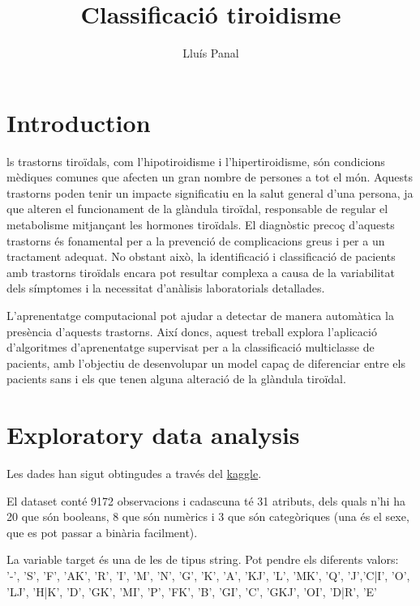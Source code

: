 \documentclass[9pt,a4paper,twoside]{tau-class/tau}
\title{Classificació tiroidisme}
\author[a,1]{Lluís Panal}
\affil[a]{1668072}
\begin{document}
    \maketitle 
    \thispagestyle{firststyle} \tauabstract 
    \tableofcontents
    \linenumbers 
    

\section{Introduction}

    ls trastorns tiroïdals, com l'hipotiroidisme i l'hipertiroidisme, són condicions mèdiques comunes que afecten un gran nombre de persones a tot el món. Aquests trastorns poden tenir un impacte significatiu en la salut general d'una persona, ja que alteren el funcionament de la glàndula tiroïdal, responsable de regular el metabolisme mitjançant les hormones tiroïdals. El diagnòstic precoç d'aquests trastorns és fonamental per a la prevenció de complicacions greus i per a un tractament adequat. No obstant això, la identificació i classificació de pacients amb trastorns tiroïdals encara pot resultar complexa a causa de la variabilitat dels símptomes i la necessitat d'anàlisis laboratorials detallades.

    L'aprenentatge computacional pot ajudar a detectar de manera automàtica la presència d'aquests trastorns. Així doncs, aquest treball explora l'aplicació d'algoritmes d'aprenentatge supervisat per a la classificació multiclasse de pacients, amb l'objectiu de desenvolupar un model capaç de diferenciar entre els pacients sans i els que tenen alguna alteració de la glàndula tiroïdal.

\section{Exploratory data analysis}
    Les dades han sigut obtingudes a través del \href{https://www.kaggle.com/datasets/emmanuelfwerr/thyroid-disease-data/data}{kaggle}.

    El dataset conté 9172 observacions i cadascuna té 31 atributs, dels quals n'hi ha 20 que són booleans, 8 que són numèrics i 3 que són categòriques (una és el sexe, que es pot passar a binària facilment). 
    
    La variable target és una de les de tipus string. Pot pendre els diferents valors: 
    '-', 'S', 'F', 'AK', 'R', 'I', 'M', 'N', 'G', 'K', 'A', 'KJ', 'L', 'MK', 'Q', 'J','C|I', 'O', 'LJ', 'H|K', 'D', 'GK', 'MI', 'P', 'FK', 'B', 'GI', 'C', 'GKJ', 'OI', 'D|R', 'E'
\end{document}

